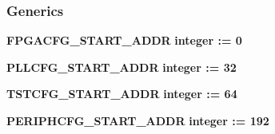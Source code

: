 \subsubsection*{Generics}
 \begin{DoxyCompactItemize}
\item 
{\bf F\+P\+G\+A\+C\+F\+G\+\_\+\+S\+T\+A\+R\+T\+\_\+\+A\+D\+DR} {\bfseries {\bfseries \textcolor{comment}{integer}\textcolor{vhdlchar}{ }\textcolor{vhdlchar}{ }\textcolor{vhdlchar}{\+:}\textcolor{vhdlchar}{=}\textcolor{vhdlchar}{ }\textcolor{vhdlchar}{ } \textcolor{vhdldigit}{0} \textcolor{vhdlchar}{ }}}
\item 
{\bf P\+L\+L\+C\+F\+G\+\_\+\+S\+T\+A\+R\+T\+\_\+\+A\+D\+DR} {\bfseries {\bfseries \textcolor{comment}{integer}\textcolor{vhdlchar}{ }\textcolor{vhdlchar}{ }\textcolor{vhdlchar}{\+:}\textcolor{vhdlchar}{=}\textcolor{vhdlchar}{ }\textcolor{vhdlchar}{ } \textcolor{vhdldigit}{32} \textcolor{vhdlchar}{ }}}
\item 
{\bf T\+S\+T\+C\+F\+G\+\_\+\+S\+T\+A\+R\+T\+\_\+\+A\+D\+DR} {\bfseries {\bfseries \textcolor{comment}{integer}\textcolor{vhdlchar}{ }\textcolor{vhdlchar}{ }\textcolor{vhdlchar}{\+:}\textcolor{vhdlchar}{=}\textcolor{vhdlchar}{ }\textcolor{vhdlchar}{ } \textcolor{vhdldigit}{64} \textcolor{vhdlchar}{ }}}
\item 
{\bf P\+E\+R\+I\+P\+H\+C\+F\+G\+\_\+\+S\+T\+A\+R\+T\+\_\+\+A\+D\+DR} {\bfseries {\bfseries \textcolor{comment}{integer}\textcolor{vhdlchar}{ }\textcolor{vhdlchar}{ }\textcolor{vhdlchar}{\+:}\textcolor{vhdlchar}{=}\textcolor{vhdlchar}{ }\textcolor{vhdlchar}{ } \textcolor{vhdldigit}{192} \textcolor{vhdlchar}{ }}}
\end{DoxyCompactItemize}
